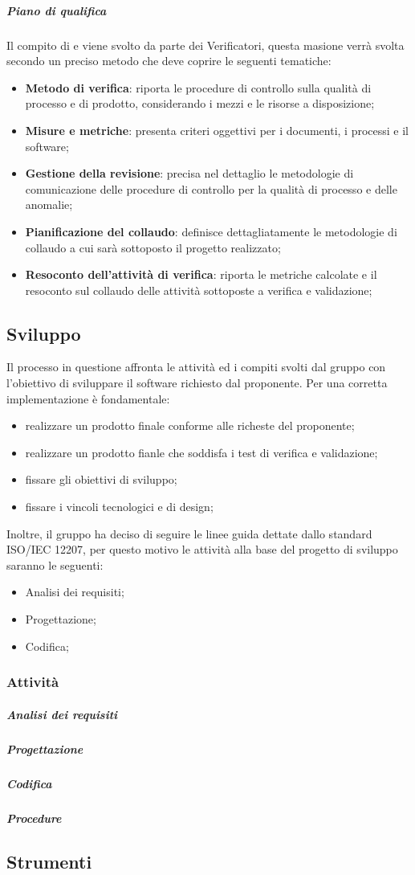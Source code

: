 \subparagraph{Piano di qualifica}
Il compito di  e  viene svolto da parte dei Verificatori, questa masione verrà svolta secondo un preciso metodo che deve coprire le seguenti tematiche:
\begin{itemize}
	\item\textbf{{Metodo di verifica}}: riporta le procedure di controllo sulla qualità di processo e di prodotto, considerando i mezzi e le risorse a disposizione; 	
	\item\textbf{{Misure e metriche}}: presenta criteri oggettivi per i documenti, i processi e il software; 	
	\item\textbf{{Gestione della revisione}}: precisa nel dettaglio le metodologie di comunicazione delle procedure di controllo per la qualità di processo e delle anomalie; 	
	\item\textbf{{Pianificazione del collaudo}}: definisce dettagliatamente le metodologie di collaudo a cui sarà sottoposto il progetto realizzato; 	
	\item\textbf{{Resoconto dell'attività di verifica}}: riporta le metriche calcolate e il resoconto sul collaudo delle attività sottoposte a verifica e validazione; 			
\end{itemize}
\subsection{Sviluppo}
Il processo in questione affronta le attività ed i compiti svolti dal gruppo con l'obiettivo di sviluppare il software richiesto dal proponente. Per una corretta implementazione è fondamentale:
\begin{itemize}
		\item realizzare un prodotto finale conforme alle richeste del proponente; 	
		\item realizzare un prodotto fianle che soddisfa i test di verifica e validazione; 	
		\item fissare gli obiettivi di sviluppo; 	
		\item fissare i vincoli tecnologici e di design; 	
\end{itemize}
Inoltre, il gruppo ha deciso di seguire le linee guida dettate dallo standard ISO/IEC 12207, per questo motivo le attività alla base del progetto di sviluppo saranno le seguenti:
\begin{itemize}
	\item Analisi dei requisiti; 	
	\item Progettazione;	
	\item Codifica; 	
\end{itemize}
\subsubsection{Attività}
\subparagraph{Analisi dei requisiti}
\subparagraph{Progettazione}
\subparagraph{Codifica}
\subparagraph{Procedure}
\subsection{Strumenti}
\pagebreak